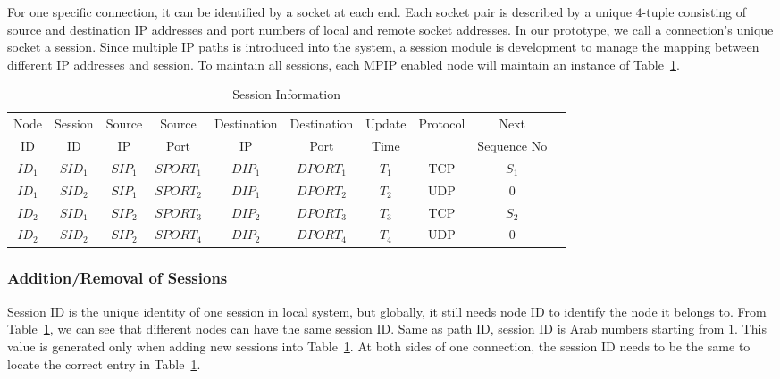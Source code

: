 For one specific connection, it can be identified by a socket at each end.  Each socket pair is described by a unique $4$-tuple consisting of source and destination IP addresses and port numbers of local and remote socket addresses. In our prototype, we call a connection\textquoteright s unique socket a session. Since multiple IP paths is introduced into the system, a session module is development to manage the mapping between different IP addresses and session. To maintain all sessions, each MPIP enabled node will maintain an instance of Table~\ref{tb.ss}.

\begin{table}
\caption{\label{tb.ss}Session Information}
\centering
\begin{tabular}{|c|c|c|c|c|c|c|c|c|c|}
\hline
Node  & Session &  Source &  Source & Destination & Destination & Update  & Protocol  &    Next      \\
  ID  &   ID    &    IP   &   Port  &     IP      &    Port     &  Time   &           &  Sequence No \\
\hline
${ID}_1$&${SID}_1$&${SIP}_{1}$&${SPORT}_{1}$&${DIP}_{1}$&${DPORT}_{1}$&$T_1$&TCP&$S_1$               \\
\hline
${ID}_1$&${SID}_2$&${SIP}_{1}$&${SPORT}_{2}$&${DIP}_{1}$&${DPORT}_{2}$&$T_2$&UDP&$0$                 \\
\hline
${ID}_2$&${SID}_1$&${SIP}_{2}$&${SPORT}_{3}$&${DIP}_{2}$&${DPORT}_{3}$&$T_3$&TCP&$S_2$              \\
\hline
${ID}_2$&${SID}_2$&${SIP}_{2}$&${SPORT}_{4}$&${DIP}_{2}$&${DPORT}_{4}$&$T_4$&UDP&$0$                 \\
\hline
\end{tabular}
\end{table}


\subsubsection{Addition/Removal of Sessions}

Session ID is the unique identity of one session in local system, but globally, it still needs node ID to identify the node it belongs to. From Table~\ref{tb.ss}, we can see that different nodes can have the same session ID. Same as path ID, session ID is Arab numbers starting from $1$. This value is generated only when adding new sessions into Table~\ref{tb.ss}. At both sides of one connection, the session ID needs to be the same to locate the correct entry in Table~\ref{tb.ss}.


